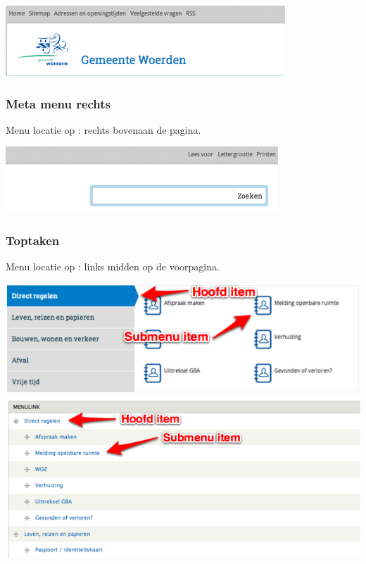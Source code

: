 \begin{center}
	\includegraphics[width=\textwidth]{img/menu_metalinks.png}
\end{center}

\bigskip

\subsubsection{Meta menu rechts}\label{metamenurechts}
Menu locatie op \drupalpath{}: rechts bovenaan de pagina.
\bigskip

\begin{center}
	\includegraphics[width=\textwidth]{img/menu_metarechts.png}
\end{center}

\bigskip

\subsubsection{Toptaken}\label{toptaken}
Menu locatie op \drupalpath{}: links midden op de voorpagina.
\bigskip

\begin{center}
	\includegraphics[width=\textwidth]{img/menu_toptaken.png}
	\includegraphics[width=\textwidth]{img/menu_toptaken2.png}
\end{center}
